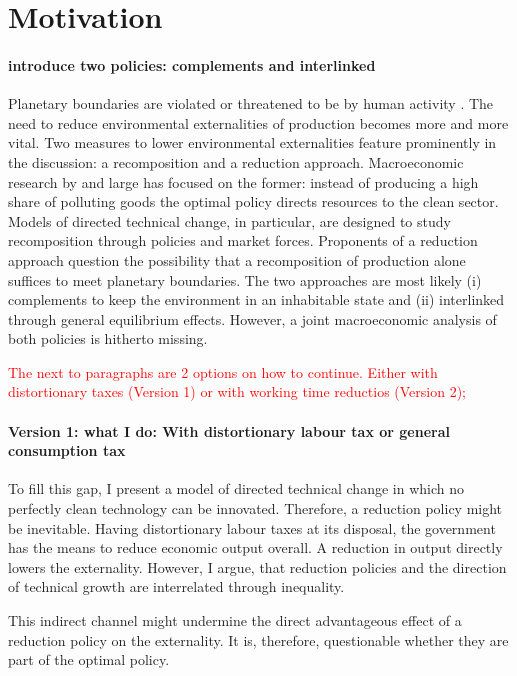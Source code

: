 \documentclass[12pt]{article}
\newcommand{\tr}[1]{\textcolor{red}{#1}}
\begin{document}
\section{Motivation}

\paragraph{introduce two policies: complements and interlinked}
Planetary boundaries are violated or threatened to be by human activity \citep{Rockstrom2009AHumanity}. The need to reduce environmental externalities of production becomes more and more vital.  %
Two measures to lower environmental externalities feature prominently in the discussion: a recomposition and a reduction approach. Macroeconomic research by and large has focused on the former: instead of producing a high share of polluting goods the optimal policy directs resources to the clean sector. Models of directed technical change, in particular, are designed to study recomposition through policies and market forces.
Proponents of a reduction approach question the possibility that a recomposition of production alone suffices to meet planetary boundaries. The two approaches are most likely (i) complements to keep the environment in an inhabitable state and (ii) interlinked through general equilibrium effects. However,
a joint macroeconomic analysis of both policies is hitherto missing. 

\tr{The next to paragraphs are 2 options on how to continue. Either with distortionary taxes (Version 1) or with working time reductios (Version 2); }
\paragraph{Version 1: what I do: With distortionary labour tax or general consumption tax}
To fill this gap, I present a model of directed technical change in which no perfectly clean technology can be innovated. Therefore, a reduction policy might be inevitable. Having distortionary labour taxes at its disposal, the government has the means to reduce economic output overall. A reduction in output directly lowers the externality. However, I argue, that reduction policies and the direction of technical growth are interrelated through inequality. 


 This indirect channel might undermine the direct advantageous effect of a reduction policy on the externality. It is, therefore, questionable whether they are part of the optimal policy.
\end{document}
